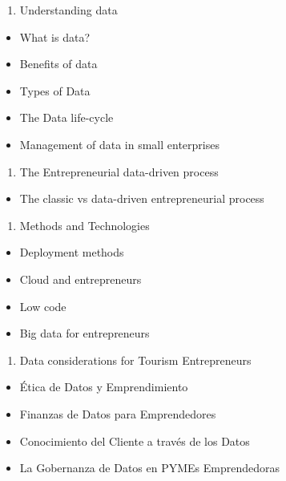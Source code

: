 \documentclass[
  letterpaper,
  DIV=11,
  numbers=noendperiod]{scrreprt}
\providecommand{\tightlist}{%
  \setlength{\itemsep}{0pt}\setlength{\parskip}{0pt}}\usepackage{longtable,booktabs,array}
\begin{document}
\begin{enumerate}
\def\labelenumi{\arabic{enumi}.}
\setcounter{enumi}{1}
\tightlist
\item
  Understanding data
\end{enumerate}

\begin{itemize}
\tightlist
\item
  What is data?
\item
  Benefits of data
\item
  Types of Data
\item
  The Data life-cycle
\item
  Management of data in small enterprises
\end{itemize}

\begin{enumerate}
\def\labelenumi{\arabic{enumi}.}
\setcounter{enumi}{2}
\tightlist
\item
  The Entrepreneurial data-driven process
\end{enumerate}

\begin{itemize}
\tightlist
\item
  The classic vs data-driven entrepreneurial process
\end{itemize}

\begin{enumerate}
\def\labelenumi{\arabic{enumi}.}
\setcounter{enumi}{3}
\tightlist
\item
  Methods and Technologies
\end{enumerate}

\begin{itemize}
\tightlist
\item
  Deployment methods
\item
  Cloud and entrepreneurs
\item
  Low code
\item
  Big data for entrepreneurs
\end{itemize}

\begin{enumerate}
\def\labelenumi{\arabic{enumi}.}
\setcounter{enumi}{4}
\tightlist
\item
  Data considerations for Tourism Entrepreneurs
\end{enumerate}

\begin{itemize}
\tightlist
\item
  Ética de Datos y Emprendimiento
\item
  Finanzas de Datos para Emprendedores
\item
  Conocimiento del Cliente a través de los Datos
\item
  La Gobernanza de Datos en PYMEs Emprendedoras
\end{itemize}
\end{document}
